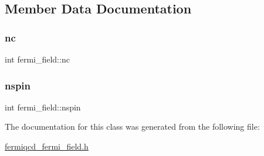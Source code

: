 \subsection{Member Data Documentation}
\mbox{\label{classfermi__field_a10875de82035b0689d0229ea80c8f089}} 
\subsubsection{\texorpdfstring{nc}{nc}}
{\footnotesize\ttfamily int fermi\+\_\+field\+::nc}

\mbox{\label{classfermi__field_a664546510ce0d76d234d6526c3c0282b}} 
\subsubsection{\texorpdfstring{nspin}{nspin}}
{\footnotesize\ttfamily int fermi\+\_\+field\+::nspin}



The documentation for this class was generated from the following file\+:\begin{DoxyCompactItemize}
\item 
\hyperlink{fermiqcd__fermi__field_8h}{fermiqcd\+\_\+fermi\+\_\+field.\+h}\end{DoxyCompactItemize}
